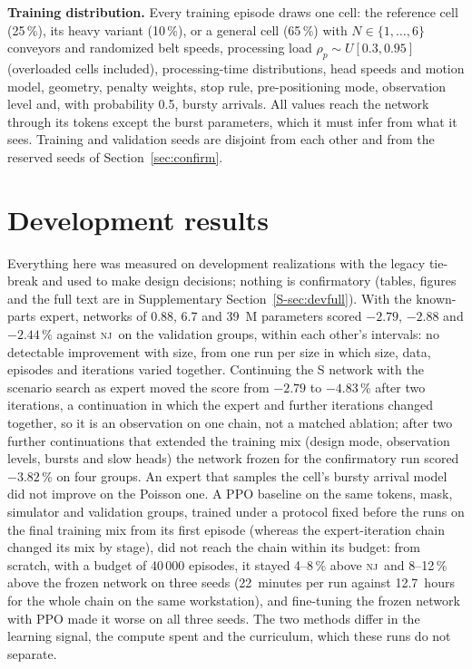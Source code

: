 \documentclass[11pt,a4paper]{article}
\theoremstyle{plain}
\theoremstyle{definition}
\theoremstyle{remark}
\newcommand{\nj}{\textsc{nj}}
\newcommand{\Supp}[1]{Supplementary Section~\ref{S-#1}}
\begin{document}
\textbf{Training distribution.}\label{sec:dist} Every training episode draws one cell: the
reference cell (25\,\%), its heavy variant (10\,\%), or a general cell (65\,\%) with
$N\in\{1,\dots,6\}$ conveyors and randomized belt speeds, processing load
$\rho_p\sim U[0.3,0.95]$ (overloaded cells included), processing-time distributions, head
speeds and motion model, geometry, penalty weights, stop rule, pre-positioning mode,
observation level and, with probability 0.5, bursty arrivals. All values reach the network
through its tokens except the burst parameters, which it must infer from what it sees.
Training and validation seeds are disjoint from each other and from the reserved seeds of
Section~\ref{sec:confirm}.

\section{Development results}\label{sec:dev}
Everything here was measured on development realizations with the legacy tie-break and used
to make design decisions; nothing is confirmatory (tables, figures and the full text are in
\Supp{sec:devfull}). With the known-parts expert, networks of 0.88, 6.7 and 39~M parameters
scored $-2.79$, $-2.88$ and $-2.44$\,\% against \nj\ on the validation groups, within each
other's intervals: no detectable improvement with size, from one run per size in which
size, data, episodes and iterations varied together. Continuing the S network with the
scenario search as expert moved the score from $-2.79$ to $-4.83$\,\% after two iterations,
a continuation in which the expert and further iterations changed together, so it is an
observation on one chain, not a matched ablation; after two further continuations that
extended the training mix (design mode, observation levels, bursts and slow heads) the
network frozen for the confirmatory run scored $-3.82$\,\% on four groups. An expert that
samples the cell's bursty arrival model did not improve on the Poisson one. A PPO baseline
\cite{Schulman2017} on the same tokens, mask, simulator and validation groups, trained under
a protocol fixed before the runs on the final training mix from its first episode
(whereas the expert-iteration chain changed its mix by stage), did not
reach the chain within its budget: from scratch, with a budget of 40\,000 episodes, it stayed 4--8\,\%
above \nj\ and 8--12\,\% above the frozen network on three seeds (22~minutes per run against
12.7~hours for the whole chain on the same workstation), and fine-tuning the frozen network
with PPO made it worse on all three seeds. The two methods differ in the learning signal,
the compute spent and the curriculum, which these runs do not separate.
\end{document}
